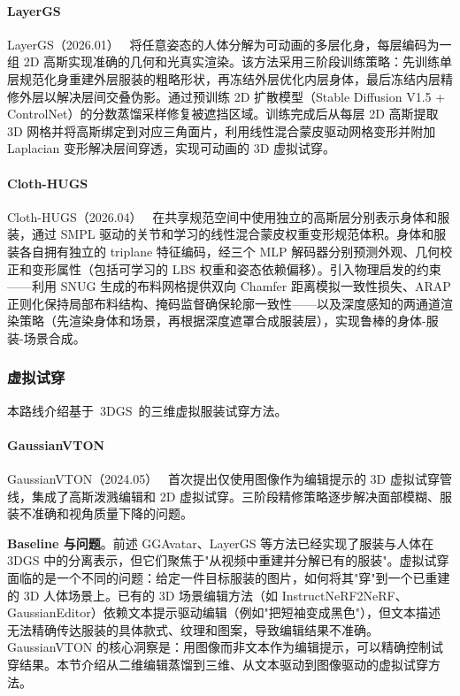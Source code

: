 \paragraph{LayerGS}

LayerGS（2026.01）~\cite{2601_05853} 将任意姿态的人体分解为可动画的多层化身，每层编码为一组 2D 高斯实现准确的几何和光真实渲染。该方法采用三阶段训练策略：先训练单层规范化身重建外层服装的粗略形状，再冻结外层优化内层身体，最后冻结内层精修外层以解决层间交叠伪影。通过预训练 2D 扩散模型（Stable Diffusion V1.5 + ControlNet）的分数蒸馏采样修复被遮挡区域。训练完成后从每层 2D 高斯提取 3D 网格并将高斯绑定到对应三角面片，利用线性混合蒙皮驱动网格变形并附加 Laplacian 变形解决层间穿透，实现可动画的 3D 虚拟试穿。

\paragraph{Cloth-HUGS}

Cloth-HUGS（2026.04）~\cite{2604_15875} 在共享规范空间中使用独立的高斯层分别表示身体和服装，通过 SMPL 驱动的关节和学习的线性混合蒙皮权重变形规范体积。身体和服装各自拥有独立的 triplane 特征编码，经三个 MLP 解码器分别预测外观、几何校正和变形属性（包括可学习的 LBS 权重和姿态依赖偏移）。引入物理启发的约束——利用 SNUG 生成的布料网格提供双向 Chamfer 距离模拟一致性损失、ARAP 正则化保持局部布料结构、掩码监督确保轮廓一致性——以及深度感知的两通道渲染策略（先渲染身体和场景，再根据深度遮罩合成服装层），实现鲁棒的身体-服装-场景合成。

\subsubsection{虚拟试穿}

本路线介绍基于~3DGS~的三维虚拟服装试穿方法。

\paragraph{GaussianVTON}

GaussianVTON（2024.05）~\cite{2405_07472} 首次提出仅使用图像作为编辑提示的 3D 虚拟试穿管线，集成了高斯泼溅编辑和 2D 虚拟试穿。三阶段精修策略逐步解决面部模糊、服装不准确和视角质量下降的问题。

\textbf{Baseline 与问题}。前述 GGAvatar、LayerGS 等方法已经实现了服装与人体在 3DGS 中的分离表示，但它们聚焦于"从视频中重建并分解已有的服装"。虚拟试穿面临的是一个不同的问题：给定一件目标服装的图片，如何将其"穿"到一个已重建的 3D 人体场景上。已有的 3D 场景编辑方法（如 InstructNeRF2NeRF、GaussianEditor）依赖文本提示驱动编辑（例如"把短袖变成黑色"），但文本描述无法精确传达服装的具体款式、纹理和图案，导致编辑结果不准确。GaussianVTON 的核心洞察是：用图像而非文本作为编辑提示，可以精确控制试穿结果。本节介绍从二维编辑蒸馏到三维、从文本驱动到图像驱动的虚拟试穿方法。

